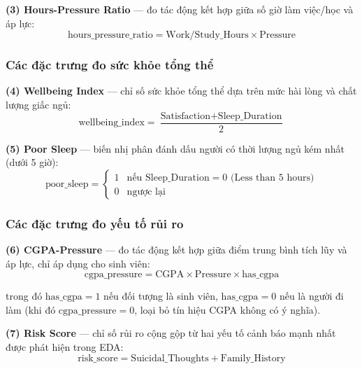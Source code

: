 \textbf{(3) Hours-Pressure Ratio} --- đo tác động kết hợp giữa số giờ làm việc/học và áp lực:
\begin{equation}
\text{hours\_pressure\_ratio} = \text{Work/Study\_Hours} \times \text{Pressure}
\label{eq:hours_pressure}
\end{equation}

\subsubsection{Các đặc trưng đo sức khỏe tổng thể}

\textbf{(4) Wellbeing Index} --- chỉ số sức khỏe tổng thể dựa trên mức hài lòng và chất lượng giấc ngủ:
\begin{equation}
\text{wellbeing\_index} = \frac{\text{Satisfaction} + \text{Sleep\_Duration}}{2}
\label{eq:wellbeing}
\end{equation}

\textbf{(5) Poor Sleep} --- biến nhị phân đánh dấu người có thời lượng ngủ kém nhất (dưới 5 giờ):
\begin{equation}
\text{poor\_sleep} = \begin{cases} 1 & \text{nếu Sleep\_Duration} = 0 \text{ (Less than 5 hours)} \\ 0 & \text{ngược lại} \end{cases}
\label{eq:poor_sleep}
\end{equation}

\subsubsection{Các đặc trưng đo yếu tố rủi ro}

\textbf{(6) CGPA-Pressure} --- đo tác động kết hợp giữa điểm trung bình tích lũy và áp lực, chỉ áp dụng cho sinh viên:
\begin{equation}
\text{cgpa\_pressure} = \text{CGPA} \times \text{Pressure} \times \text{has\_cgpa}
\label{eq:cgpa_pressure}
\end{equation}

trong đó $\text{has\_cgpa} = 1$ nếu đối tượng là sinh viên, $\text{has\_cgpa} = 0$ nếu là người đi làm (khi đó $\text{cgpa\_pressure} = 0$, loại bỏ tín hiệu CGPA không có ý nghĩa).

\textbf{(7) Risk Score} --- chỉ số rủi ro cộng gộp từ hai yếu tố cảnh báo mạnh nhất được phát hiện trong EDA:
\begin{equation}
\text{risk\_score} = \text{Suicidal\_Thoughts} + \text{Family\_History}
\label{eq:risk_score}
\end{equation}


